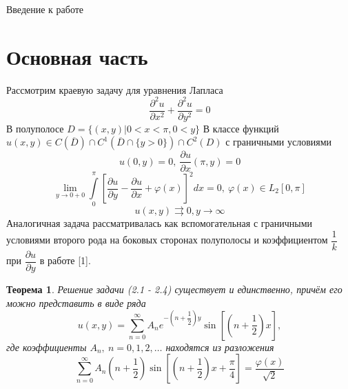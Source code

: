 \documentclass[a4paper, 12pt]{article}
\newtheorem{theorem}{Теорема}
\numberwithin{equation}{section}
\numberwithin{lemma}{section}
\numberwithin{definition}{section}
\numberwithin{notabene}{section}
\numberwithin{corollary}{section}
\begin{document}
Введение к работе

\section{Основная часть}

Рассмотрим краевую задачу для уравнения Лапласа
\begin{equation}
	\dfrac{\partial^2 u}{\partial x^2} +\dfrac{\partial^2 u}{\partial y^2} = 0
\end{equation}
В полуполосе $D = \{(x,y) \vert 0 < x < \pi, 0 < y\}$\newline
В классе функций $u(x,y) \in C(\overline{D}) \cap C^1(\overline{D} \cap \{y > 0\}) \cap C^2 (D)$ \newline
с граничными условиями
\begin{equation}
	u(0, y) = 0, \ \dfrac{\partial u}{\partial x} (\pi, y) = 0
\end{equation}
\begin{equation}
	\lim\limits_{y \to 0 + 0} \int\limits_0^\pi \left[\dfrac{\partial u}{\partial y} - \dfrac{\partial u}{\partial x} + \varphi(x) \right]^2 dx = 0, \ \varphi(x) \in L_2[0,\pi]
\end{equation}
\begin{equation}
	u(x,y) \rightrightarrows 0, y \to \infty
\end{equation}
Аналогичная задача рассматривалась как вспомогательная с граничными условиями второго рода на боковых сторонах полуполосы и коэффициентом $\dfrac{1}{k}$ при $\dfrac{\partial u}{\partial y}$ в работе [1].
\begin{theorem}
    Решение задачи (2.1 - 2.4) существует и единственно, причём его можно представить в виде ряда
    \begin{equation}
    	u(x,y) = \sum\limits_{n=0}^{\infty} A_n e^{-\left(n + \dfrac12\right)y} \sin{\left[\left(n + \dfrac12\right)x\right]},
    \end{equation}
	где коэффициенты $A_n, \ n =0,1,2, \dots$ находятся из разложения
	\begin{equation}
		\sum\limits_{n=0}^{\infty} A_n \left(n + \dfrac12 \right) \sin{\left[\left(n +\dfrac12\right)x + \dfrac\pi4\right]} = \dfrac{\varphi(x)}{\sqrt2}
	\end{equation}
\end{theorem}
\end{document}
